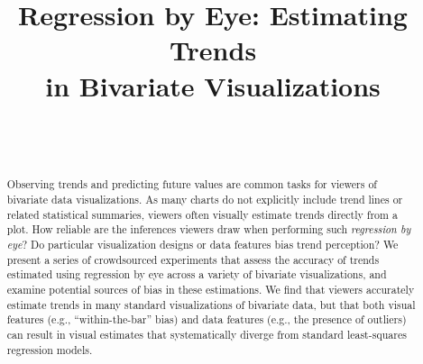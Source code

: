 \documentclass{sigchi}
\def\plaintitle{Regression by Eye: Estimating Trends\\in Bivariate Visualizations}
\begin{document}
\title{\plaintitle}

\author{%
  \\
  \\
}

\maketitle

\begin{abstract}
Observing trends and predicting future values are common tasks for viewers of bivariate data visualizations. As many charts do not explicitly include trend lines or related statistical summaries, viewers often visually estimate trends directly from a plot. How reliable are the inferences viewers draw when performing such \emph{regression by eye}? Do particular visualization designs or data features bias trend perception? We present a series of crowdsourced experiments that assess the accuracy of trends estimated using regression by eye across a variety of bivariate visualizations, and examine potential sources of bias in these estimations. We find that viewers accurately estimate trends in many standard visualizations of bivariate data, but that both visual features (e.g., ``within-the-bar'' bias) and data features (e.g., the presence of outliers) can result in visual estimates that systematically diverge from standard least-squares regression models.
\end{abstract}

\end{document}
